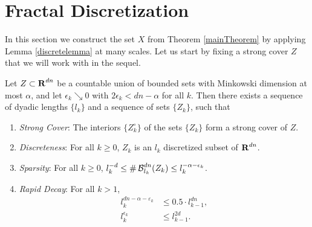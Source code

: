 \section{Fractal Discretization}\label{discretizationsection}

In this section we construct the set $X$ from Theorem \ref{mainTheorem} by applying Lemma \ref{discretelemma} at many scales. Let us start by fixing a strong cover $Z$ that we will work with in the sequel.


\begin{lemma}\label{coveringLemma}
	Let $Z \subset \operatorname{\mathbf{R}}^{dn}$ be a countable union of bounded sets with Minkowski dimension at most $\alpha$, and let $\epsilon_k \searrow 0$ with $2\epsilon_k < dn - \alpha$ for all $k$. Then there exists a sequence of dyadic lengths $\{ l_k \}$ and a sequence of sets $\{ Z_k \}$, such that
	\begin{enumerate}
		\item\label{StrongCoverProperty} \emph{Strong Cover}: The interiors $\{ Z_k^\circ \}$ of the sets $\{ Z_k \}$ form a strong cover of $Z$.

		\item\label{DiscretenessProperty} \emph{Discreteness}: For all $k \geq 0$, $Z_k$ is an $l_k$ discretized subset of $\operatorname{\mathbf{R}}^{dn}$.

		\item\label{SparsityProperty} \emph{Sparsity}: For all $k \geq 0$, $l_k^{-d} \leq \#\operatorname{\mathcal{B}}^{dn}_{l_k}(Z_k) \leq l_k^{-\alpha-\epsilon_k}$.

		\item\label{RapidDecayProperty} \emph{Rapid Decay}: For all $k > 1$,
			\begin{align}
				l_k^{dn-\alpha-\varepsilon_k} & \leq 0.5 \cdot l_{k-1}^{dn} \label{coverBoundRequirement}, \\
				l_k^{\epsilon_k} & \leq l_{k-1}^{2d}\label{quadDecayRequirement}.
			\end{align}
	\end{enumerate}
\end{lemma}

